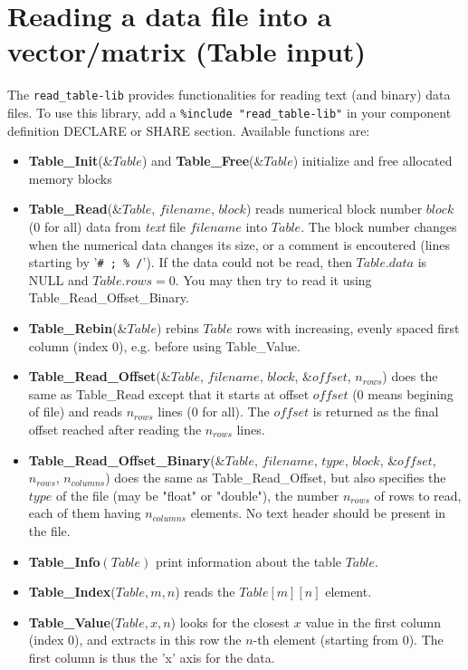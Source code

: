 \section{Reading a data file into a vector/matrix (Table input)}
The \verb+read_table-lib+ provides functionalities for reading text (and binary) data files. To use this library, add a \verb+%include "read_table-lib"+ in your component definition DECLARE or SHARE section. Available functions are:

\begin{itemize}
\item {\bf Table\_Init}(\&$Table$) and {\bf Table\_Free}(\&$Table$) initialize and free allocated memory blocks
\item {\bf Table\_Read}(\&$Table$, $filename$, $block$) reads numerical block number $block$ (0 for all) data from \emph{text} file $filename$ into $Table$. The block number changes when the numerical data changes its size, or a comment is encoutered (lines starting by '\verb+# ; % /+'). If the data could not be read, then $Table.data$ is NULL and $Table.rows = 0$. You may then try to read it using Table\_Read\_Offset\_Binary.
\item {\bf Table\_Rebin}(\&$Table$) rebins $Table$ rows with increasing, evenly spaced first column (index 0), e.g. before using Table\_Value.
\item {\bf Table\_Read\_Offset}(\&$Table$, $filename$, $block$, \&$offset$, $n_{rows}$) does the same as Table\_Read except that it starts at offset $offset$ (0 means begining of file) and reads $n_{rows}$ lines (0 for all). The $offset$ is returned as the final offset reached after reading the $n_{rows}$ lines.
\item {\bf Table\_Read\_Offset\_Binary}(\&$Table$, $filename$, $type$,
  $block$, \&$offset$, $n_{rows}$, $n_{columns}$) does the same as
  Table\_Read\_Offset, but also specifies the $type$ of the file (may
  be "float" or "double"), the number $n_{rows}$ of rows to read, each
  of them having $n_{columns}$ elements. No text header should be present
  in the file.
\item {\bf Table\_Info}$(Table)$ print information about the table $Table$.
\item {\bf Table\_Index}($Table, m, n$) reads the $Table[m][n]$ element.
\item {\bf Table\_Value}($Table, x, n$) looks for the closest $x$
  value in the first column (index 0), and extracts in this row the
  $n$-th element (starting from 0). The first column is thus the 'x' axis for the data.
\end{itemize}

